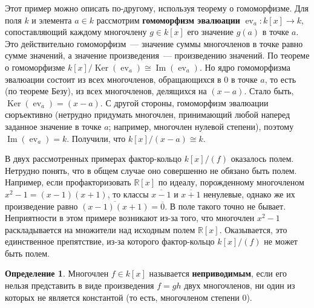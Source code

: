 \documentclass[a4paper,11pt]{scrartcl}
\theoremstyle{plain}
\theoremstyle{definition}
\newtheorem{definition}[theorem]{Определение}
\newcommand\dfn[1]{\textbf{#1}}
\newcommand\mb{\mathbb}
\newcommand\isom{\cong}
\newcommand{\Img}{\operatorname{Im}}
\newcommand\ev{{\operatorname{ev}}}
\newcommand\Ker{\operatorname{Ker}}
\begin{document}
Этот пример можно описать по-другому, используя теорему о
гомоморфизме. Для поля $k$ и элемента $a\in k$ рассмотрим
\dfn{гомоморфизм эвалюации} $\ev_a\colon k[x]\to k$, сопоставляющий
каждому многочлену $g\in k[x]$ его значение $g(a)$ в точке $a$. Это
действительно гомоморфизм~--- значение суммы многочленов в точке равно
сумме значений, а значение произведения~--- произведению значений. По
теореме о гомоморфизме $k[x]/\Ker(\ev_a)\isom\Img(\ev_a)$. Но ядро
гомоморфизма эвалюации состоит из всех многочленов, обращающихся в 0 в
точке $a$, то есть (по теореме Безу), из всех многочленов, делящихся
на $(x-a)$. Стало быть, $\Ker(\ev_a)=(x-a)$. С другой стороны,
гомоморфизм эвалюации сюръективно (нетрудно придумать многочлен,
принимающий любой наперед заданное значение в точке $a$; например,
многочлен нулевой степени), поэтому $\Img(\ev_a)=k$. Получили, что
$k[x]/(x-a)\isom k$.

В двух рассмотренных примерах
фактор-кольцо $k[x]/(f)$ оказалось полем. Нетрудно
понять, что в общем случае оно совершенно не обязано быть
полем. Например, если профакторизовать $\mb R[x]$ по идеалу,
порожденному многочленом $x^2-1=(x-1)(x+1)$, то классы
$\overline{x-1}$ и $\overline{x+1}$ ненулевые, однако же их
произведение равно $\overline{(x-1)(x+1)}=\overline{0}$. В поле такого
точно не бывает. Неприятности в этом примере возникают из-за того, что
многочлен $x^2-1$ раскладывается на множители над исходным полем $\mb
R[x]$. Оказывается, это единственное препятствие, из-за которого
фактор-кольцо $k[x]/(f)$ не может быть полем.

\begin{definition}
Многочлен $f\in k[x]$ называется \dfn{неприводимым}, если его нельзя
представить в виде произведения $f=gh$ двух многочленов, ни один из
которых не является константой (то есть, многочленом степени 0).
\end{definition}
\end{document}
